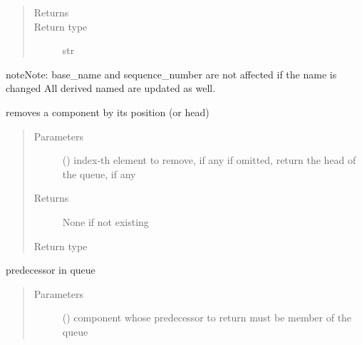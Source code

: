 \documentclass[letterpaper,10pt,english]{sphinxmanual}
\begin{document}
\begin{fulllineitems}
\begin{fulllineitems}
\begin{quote}
\begin{description}
\item[{Returns}] \leavevmode
{}

\item[{Return type}] \leavevmode
str

\end{description}\end{quote}

\begin{sphinxadmonition}{note}{Note:}
base\_name and sequence\_number are not affected if the name is changed 
All derived named are updated as well.
\end{sphinxadmonition}

\end{fulllineitems}


\begin{fulllineitems}
\label{\detokenize{Reference:salabim.Queue.pop}}
removes a component by its position (or head)
\begin{quote}\begin{description}
\item[{Parameters}] \leavevmode
{} () \textendash{} index-th element to remove, if any 
if omitted, return the head of the queue, if any

\item[{Returns}] \leavevmode
{} \textendash{} None if not existing

\item[{Return type}] \leavevmode
{\hyperref[\detokenize{Reference:salabim.Component}]{}}

\end{description}\end{quote}

\end{fulllineitems}


\begin{fulllineitems}
\label{\detokenize{Reference:salabim.Queue.predecessor}}
predecessor in queue
\begin{quote}\begin{description}
\item[{Parameters}] \leavevmode
{} ({\hyperref[\detokenize{Reference:salabim.Component}]{}}) \textendash{} component whose predecessor to return 
must be member of the queue


\end{description}
\end{quote}
\end{fulllineitems}
\end{fulllineitems}
\end{document}
